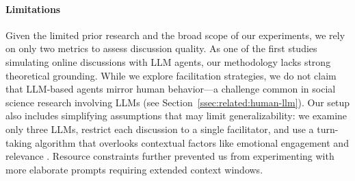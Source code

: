 %
\paragraph{Limitations} 
Given the limited prior research and the broad scope of our experiments, we rely on only two metrics to assess discussion quality. As one of the first studies simulating online discussions with LLM agents, our methodology lacks strong theoretical grounding. While we explore facilitation strategies, we do not claim that LLM-based agents mirror human behavior—a challenge common in social science research involving LLMs (see Section~\ref{ssec:related:human-llm}). Our setup also includes simplifying assumptions that may limit generalizability: we examine only three LLMs, restrict each discussion to a single facilitator, and use a turn-taking algorithm that overlooks contextual factors like emotional engagement and relevance \cite{robert_2016_comment, Ziegele03102018}. Resource constraints further prevented us from experimenting with more elaborate prompts requiring extended context windows.

